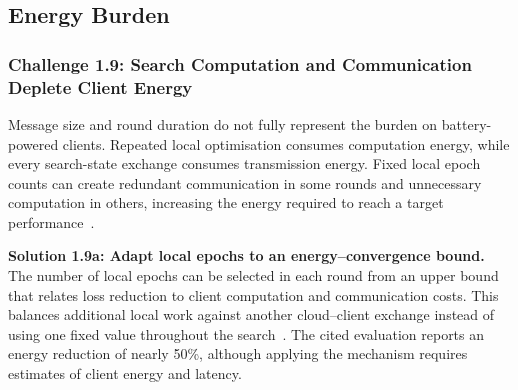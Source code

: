 \subsection{Energy Burden}

\subsubsection{Challenge 1.9: Search Computation and Communication Deplete Client Energy}

Message size and round duration do not fully represent the burden on battery-powered clients. Repeated local optimisation consumes computation energy, while every search-state exchange consumes transmission energy. Fixed local epoch counts can create redundant communication in some rounds and unnecessary computation in others, increasing the energy required to reach a target performance~\cite{f2nas_2024}.

\noindent\textbf{Solution 1.9a: Adapt local epochs to an energy--convergence bound.} The number of local epochs can be selected in each round from an upper bound that relates loss reduction to client computation and communication costs. This balances additional local work against another cloud--client exchange instead of using one fixed value throughout the search~\cite{f2nas_2024}. The cited evaluation reports an energy reduction of nearly 50\%, although applying the mechanism requires estimates of client energy and latency.
